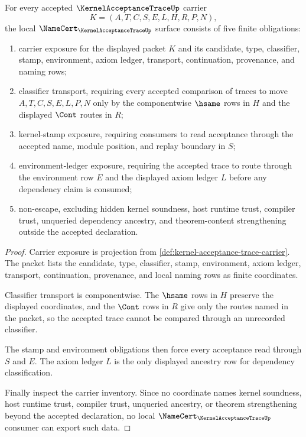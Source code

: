 \begin{theorem}
\label{thm:kernel-acceptance-trace-namecert-obligations}
For every accepted $\KernelAcceptanceTraceUp$ carrier
$$
K=(A,T,C,S,E,L,H,R,P,N),
$$
the local $\NameCert_{\KernelAcceptanceTraceUp}$ surface consists of five finite obligations:
\begin{enumerate}
\item carrier exposure for the displayed packet $K$ and its candidate, type, classifier, stamp, environment, axiom ledger, transport, continuation, provenance, and naming rows;
\item classifier transport, requiring every accepted comparison of traces to move $A,T,C,S,E,L,P,N$ only by the componentwise $\hsame$ rows in $H$ and the displayed $\Cont$ routes in $R$;
\item kernel-stamp exposure, requiring consumers to read acceptance through the accepted name, module position, and replay boundary in $S$;
\item environment-ledger exposure, requiring the accepted trace to route through the environment row $E$ and the displayed axiom ledger $L$ before any dependency claim is consumed;
\item non-escape, excluding hidden kernel soundness, host runtime trust, compiler trust, unqueried dependency ancestry, and theorem-content strengthening outside the accepted declaration.
\end{enumerate}
\end{theorem}
\begin{proof}
Carrier exposure is projection from \autoref{def:kernel-acceptance-trace-carrier}. The packet lists the candidate, type, classifier, stamp, environment, axiom ledger, transport, continuation, provenance, and local naming rows as finite coordinates.

Classifier transport is componentwise. The $\hsame$ rows in $H$ preserve the displayed coordinates, and the $\Cont$ rows in $R$ give only the routes named in the packet, so the accepted trace cannot be compared through an unrecorded classifier.

The stamp and environment obligations then force every acceptance read through $S$ and $E$. The axiom ledger $L$ is the only displayed ancestry row for dependency classification.

Finally inspect the carrier inventory. Since no coordinate names kernel soundness, host runtime trust, compiler trust, unqueried ancestry, or theorem strengthening beyond the accepted declaration, no local $\NameCert_{\KernelAcceptanceTraceUp}$ consumer can export such data.
\end{proof}


